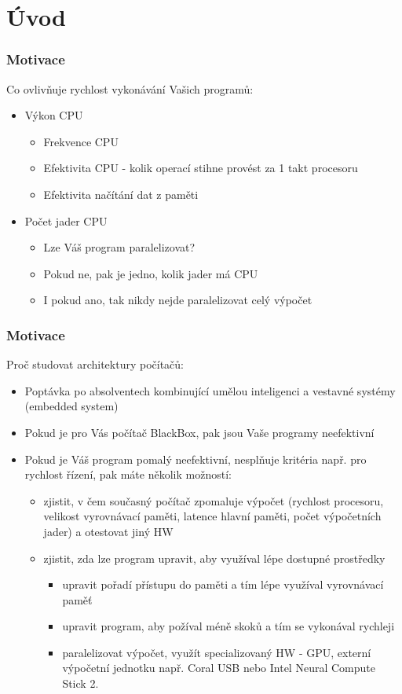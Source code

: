 \documentclass{beamer}
\subtitle{Lekce 01. Úvod}
\author{Petr Štěpán\\ \small\texttt{stepan@fel.cvut.cz}}
\begin{document}
\maketitle

\section{Úvod}


\begin{frame}
\frametitle{Motivace}
Co ovlivňuje rychlost vykonávání Vašich programů:
\begin{itemize}
\item Výkon CPU 
  \begin{itemize}
    \item Frekvence CPU
    \item Efektivita CPU - kolik operací stihne provést za 1 takt procesoru
    \item Efektivita načítání dat z paměti
  \end{itemize}
\item Počet jader CPU
  \begin{itemize}
    \item Lze Váš program paralelizovat?
    \item Pokud ne, pak je jedno, kolik jader má CPU
    \item I pokud ano, tak nikdy nejde paralelizovat celý výpočet
  \end{itemize}
\end{itemize}
\end{frame}


\begin{frame}
\frametitle{Motivace}
Proč studovat architektury počítačů:
\begin{itemize}
\item Poptávka po absolventech kombinující umělou inteligenci a vestavné systémy (embedded system)
\item Pokud je pro Vás počítač BlackBox, pak jsou Vaše programy neefektivní
\item Pokud je Váš program pomalý neefektivní, nesplňuje kritéria např. pro rychlost řízení, pak máte několik možností:
\begin{itemize}
  \item zjistit, v čem současný počítač zpomaluje výpočet (rychlost procesoru, velikost vyrovnávací paměti, latence hlavní paměti, počet výpočetních jader) a otestovat jiný HW
  \item zjistit, zda lze program upravit, aby využíval lépe dostupné prostředky 
  \begin{itemize}
    \item upravit pořadí přístupu do paměti a tím lépe využíval vyrovnávací paměť
    \item upravit program, aby požíval méně skoků a tím se vykonával rychleji
    \item paralelizovat výpočet, využít specializovaný HW - GPU, externí výpočetní jednotku např. Coral USB nebo Intel Neural Compute Stick 2.
  \end{itemize}
\end{itemize}
\end{itemize}
\end{frame}
\end{document}
